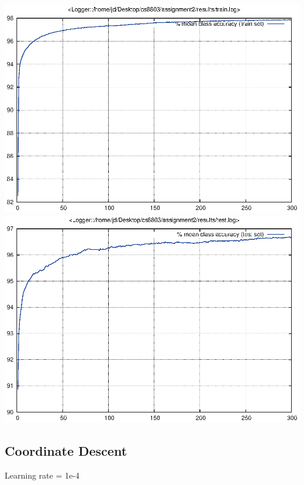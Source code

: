 \documentclass[twoside,12pt]{article}
\newcommand{\imsize}{0.5\linewidth}
\begin{document}
\includegraphics[width=\imsize]{assignment2/results/sgdwm_m9_train}
\includegraphics[width=\imsize]{assignment2/results/sgdwm_m9_test}

\subsection{Coordinate Descent}

Learning rate = 1e-4
\end{document}
